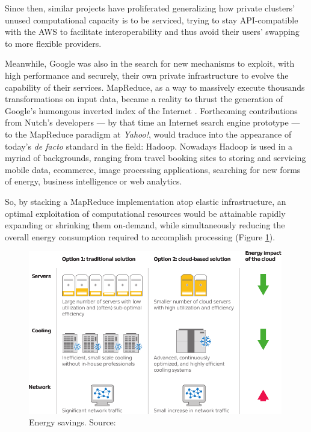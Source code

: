 Since then, similar projects have proliferated generalizing how private clusters' unused computational capacity is to be serviced, trying to stay API-compatible with the AWS to facilitate interoperability and thus avoid their users' swapping to more flexible providers.

Meanwhile, Google was also in the search for new mechanisms to exploit, with high performance and securely, their own private infrastructure to evolve the capability of their services. MapReduce, as a way to massively execute thousands transformations on input data, became a reality to thrust the generation of Google's humongous inverted index of the Internet \cite{googlemapreduce}. Forthcoming contributions from Nutch's developers --- by that time an Internet search engine prototype --- to the MapReduce paradigm at \emph{Yahoo!}, would traduce into the appearance of today's \emph{de facto} standard in the field: Hadoop. Nowadays Hadoop is used in a myriad of backgrounds, ranging from travel booking sites to storing and servicing mobile data, ecommerce, image processing applications, searching for new forms of energy, business intelligence or web analytics.

So, by stacking a MapReduce implementation atop elastic infrastructure, an optimal exploitation of computational resources would be attainable rapidly expanding or shrinking them on-demand, while simultaneously reducing the overall energy consumption required to accomplish processing (Figure \ref{fig:energysavings}).

\begin{figure}[tbp]
\begin{center}
\includegraphics[width=0.99\textwidth]{imagenes/002.pdf}
 \caption{Energy savings. Source: \cite{googleapps}}
\label{fig:energysavings}
\end{center}
\end{figure}

